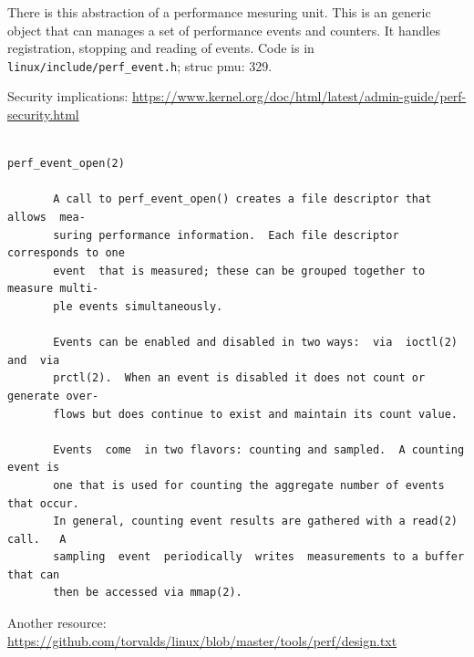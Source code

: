 There is this abstraction of a performance mesuring unit. This is an
generic object that can manages a set of performance events and
counters. It handles registration, stopping and reading of events.
Code is in \verb|linux/include/perf_event.h|; struc pmu: 329.


Security implications:
\url{https://www.kernel.org/doc/html/latest/admin-guide/perf-security.html}

\begin{verbatim}

perf_event_open(2)

       A call to perf_event_open() creates a file descriptor that  allows  mea‐
       suring performance information.  Each file descriptor corresponds to one
       event  that is measured; these can be grouped together to measure multi‐
       ple events simultaneously.

       Events can be enabled and disabled in two ways:  via  ioctl(2)  and  via
       prctl(2).  When an event is disabled it does not count or generate over‐
       flows but does continue to exist and maintain its count value.

       Events  come  in two flavors: counting and sampled.  A counting event is
       one that is used for counting the aggregate number of events that occur.
       In general, counting event results are gathered with a read(2) call.   A
       sampling  event  periodically  writes  measurements to a buffer that can
       then be accessed via mmap(2).

\end{verbatim}

Another resource:
  \url{https://github.com/torvalds/linux/blob/master/tools/perf/design.txt}
